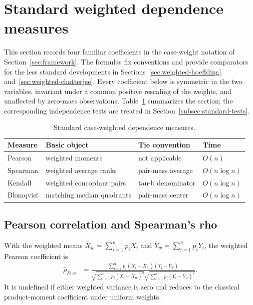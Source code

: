 \section{Standard weighted dependence measures}
\label{sec:standard-measures}

This section records four familiar coefficients in the case-weight notation of
Section~\ref{sec:framework}. The formulas fix conventions and provide
comparators for the less standard developments in
Sections~\ref{sec:weighted-hoeffding} and~\ref{sec:weighted-chatterjee}. Every
coefficient below is symmetric in the two variables, invariant under a common
positive rescaling of the weights, and unaffected by zero-mass observations.
Table~\ref{tab:standard-measures} summarizes the section; the corresponding
independence tests are treated in Section~\ref{subsec:standard-tests}.

\begin{table}[ht]
  \centering
  \caption{Standard case-weighted dependence measures.}
  \label{tab:standard-measures}
  \begin{tabular}{llll}
    \toprule
    Measure & Basic object & Tie convention & Time \\
    \midrule
    Pearson & weighted moments & not applicable & $O(n)$ \\
    Spearman & weighted average ranks & pair-mass average & $O(n\log n)$ \\
    Kendall & weighted concordant pairs & tau-b denominator & $O(n\log n)$ \\
    Blomqvist & matching median quadrants & pair-mass center & $O(n\log n)$ \\
    \bottomrule
  \end{tabular}
\end{table}

\subsection{Pearson correlation and Spearman's rho}

With the weighted means $\bar X_w = \sum_{i=1}^n p_iX_i$ and
$\bar Y_w = \sum_{i=1}^n p_iY_i$, the weighted Pearson coefficient is
\begin{align*}
    \widehat\rho_{P,w}
    &= \frac{\sum_{i=1}^n p_i(X_i-\bar X_w)(Y_i-\bar Y_w)}
            {\sqrt{\sum_{i=1}^n p_i(X_i-\bar X_w)^2}
             \sqrt{\sum_{i=1}^n p_i(Y_i-\bar Y_w)^2}}.
\end{align*}
It is undefined if either weighted variance is zero and reduces to the
classical product-moment coefficient \citep{pearson1895} under uniform
weights.

